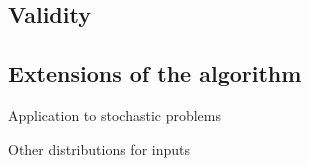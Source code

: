 \documentclass[10pt,letterpaper]{article}
\theoremstyle{definition}
\theoremstyle{remark}
\begin{document}
\subsection*{Validity}\label{sec. validityAlgo}
%
%
%
%

\subsection*{Extensions of the algorithm}\label{sec. extensions}

Application to stochastic problems

Other distributions for inputs
\end{document}
